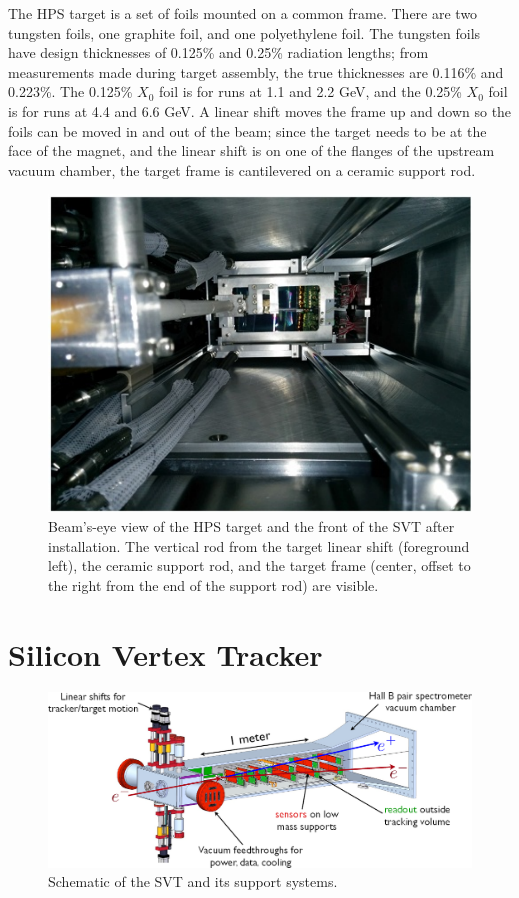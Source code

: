 The HPS target is a set of foils mounted on a common frame.
There are two tungsten foils, one graphite foil, and one polyethylene foil.
The tungsten foils have design thicknesses of 0.125\% and 0.25\% radiation lengths; from measurements made during target assembly, the true thicknesses are 0.116\% and 0.223\%.
The 0.125\% $X_0$ foil is for runs at 1.1 and 2.2 GeV, and the 0.25\% $X_0$ foil is for runs at 4.4 and 6.6 GeV.
A linear shift moves the frame up and down so the foils can be moved in and out of the beam; since the target needs to be at the face of the magnet, and the linear shift is on one of the flanges of the upstream vacuum chamber, the target frame is cantilevered on a ceramic support rod.

\begin{figure}[htp]
    \includegraphics[width=\textwidth]{detector/figs/target_photo}
    \caption{Beam's-eye view of the HPS target and the front of the SVT after installation.
    The vertical rod from the target linear shift (foreground left), the ceramic support rod, and the target frame (center, offset to the right from the end of the support rod) are visible.
    }
    \label{fig:target_photo}
\end{figure}

\section{Silicon Vertex Tracker}

\begin{figure}[htp]
    \includegraphics[width=\textwidth]{detector/figs/svt_cutaway}
    \caption{Schematic of the SVT and its support systems.}
    \label{fig:svt-schematic}
\end{figure}

